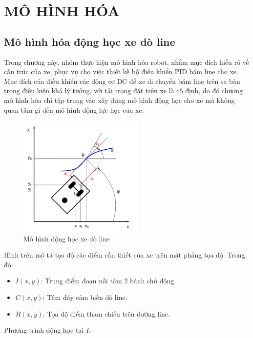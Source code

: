 \chapter{MÔ HÌNH HÓA}
     \section{Mô hình hóa động học xe dò line}
          \hspace*{0.6cm}Trong chương này, nhóm thực hiện mô hình hóa robot, nhằm mục đích hiểu rõ về cấu trúc của xe, phục vụ cho việc thiết kế bộ điều khiển PID bám line cho xe.
          \newline
          \hspace*{0.6cm}Mục đích của điều khiển các động cơ DC để xe di chuyển bám line trên sa bàn trong điều kiện khá lý tưởng, với tải trọng đặt trên xe là cố định, do đó chương mô hình hóa chỉ tập trung vào xây dựng mô hình động học cho xe mà không quan tâm 
          gì đến mô hình động lực học của xe.
          \begin{figure}[H]
               \centering
               \includegraphics[width=0.55\textwidth]{pictures/chapter5/chapter5_pic1.png}
               \caption{Mô hình động học xe dò line}
               \label{kinematic_model}
          \end{figure}         
          Hình trên mô tả tọa độ các điểm cần thiết của xe trên mặt phẳng tọa độ. Trong đó:
          \begin{itemize}
               \item $I(x, y)$: Trung điểm đoạn nối tâm 2 bánh chủ động.
               \item $C(x, y)$: Tâm dãy cảm biến dò line.
               \item $R(x, y)$: Tọa độ điểm tham chiếu trên đường line.
          \end{itemize}
          \hspace*{0.6cm}Phương trình động học tại $I$:
